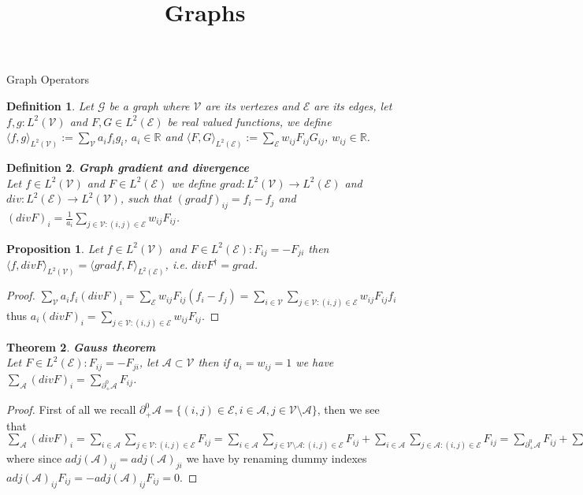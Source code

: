 \documentclass{article}
\title{Graphs}
\author{}
\date{}
\newtheorem{thm}{Theorem}[section]
\newtheorem{prop}[thm]{Proposition}
\newtheorem{defn}{Definition}[section]
\newcommand{\bb}[1]{\textbf{#1}}
\newcommand{\R}{\mathbb{R}}
\newcommand{\scal}[2]{\langle #1 , #2 \rangle}
\newcommand{\mc}{\mathcal}
\begin{document}
    \maketitle
    \begin{section}{Graph Operators}
        
	\begin{defn}
            Let $\mc{G}$ be a graph where $\mc{V}$ are its vertexes and $\mc{E}$ are its edges, let $f,g : L^2(\mc{V})$ 
	    and $F,G \in L^2(\mc{E})$ be real valued functions, we define
	    $\scal{f}{g}_{L^2(\mc{V})} := \sum_\mc{V} a_i f_i g_i$, $a_i \in \R$ and
	    $\scal{F}{G}_{L^2(\mc{E})} := \sum_\mc{E} w_{ij} F_{ij} G_{ij}$, $w_{ij} \in \R$.
	\end{defn}
        
	\begin{defn}
	    \bb{Graph gradient and divergence}\\ 
	    Let $f \in L^2(\mc{V})$ and $F \in L^2(\mc{E})$ we define $grad : L^2(\mc{V}) \to L^2(\mc{E})$ and $div : L^2(\mc{E}) \to L^2(\mc{V})$,
	    such that $(gradf)_{ij}=f_i-f_j$ and $(divF)_i=\frac{1}{a_i}\sum_{j \in \mc{V} : (i,j) \in \mc{E}} w_{ij} F_{ij}$.
	\end{defn}

	\begin{prop}
	    Let $f \in L^2(\mc{V})$ and $F \in L^2(\mc{E}) : F_{ij}=-F_{ji}$ then $\scal{f}{divF}_{L^2(\mc{V})} = \scal{gradf}{F}_{L^2(\mc{E})}$,
	    i.e. $divF^\dag = grad$.
	\end{prop}
	\begin{proof}
	    $\sum_\mc{V} a_i f_i (divF)_i = \sum_{\mc{E}} w_{ij} F_{ij} (f_i-f_j) = \sum_{i \in \mc{V}}\sum_{j \in \mc{V} : (i,j) \in \mc{E}} w_{ij} F_{ij} f_i$
	    thus $a_i (divF)_i = \sum_{j \in \mc{V} : (i,j) \in \mc{E}} w_{ij} F_{ij}$.
	\end{proof}

	\begin{thm}
	    \bb{Gauss theorem}\\
	    Let $F \in L^2(\mc{E}) : F_{ij}=-F_{ji}$, let $\mc{A} \subset \mc{V}$ then if $a_i = w_{ij} = 1$ we have
	    $\sum_{\mc{A}} (divF)_i = \sum_{\partial_+^0 \mc{A}} F_{ij}$.
	\end{thm}
	\begin{proof}
	    First of all we recall $\partial_+^0 \mc{A} = \{ (i,j) \in \mc{E}, i \in \mc{A}, j \in \mc{V \setminus A} \}$, then we see that
            $\sum_{\mc{A}} (divF)_i = \sum_{i \in \mc{A}}\sum_{j \in \mc{V} : (i,j) \in \mc{E}} F_{ij} =
	    \sum_{i \in \mc{A}}\sum_{j \in \mc{V \setminus A} : (i,j) \in \mc{E}} F_{ij} +
            \sum_{i \in \mc{A}}\sum_{j \in \mc{A} : (i,j) \in \mc{E}} F_{ij} = \sum_{\partial_+^0 \mc{A}} F_{ij} + \sum_{(i,j) \in \mc{A}^2} adj(\mc{A})_{ij} F_{ij}$
	    where since $adj(\mc{A})_{ij} = adj(\mc{A})_{ji}$ we have by renaming dummy indexes $adj(\mc{A})_{ij} F_{ij} = -adj(\mc{A})_{ij} F_{ij} = 0$.
        \end{proof}
    

\end{section}
\end{document}

